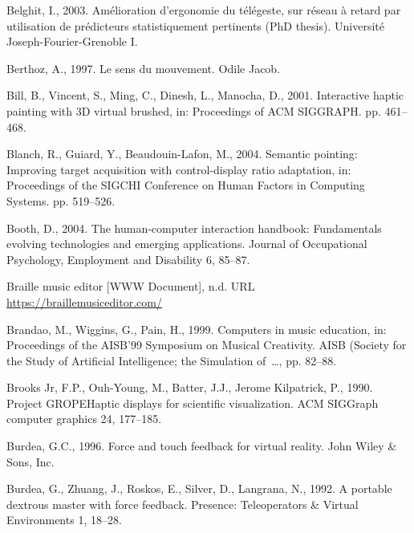 \documentclass[
]{book}
\newlength{\cslhangindent}
\newlength{\cslentryspacingunit} %
\newenvironment{CSLReferences}[2] %
 {%
  \setlength{\parindent}{0pt}
  \ifodd #1
  \let\oldpar\par
  \def\par{\hangindent=\cslhangindent\oldpar}
  \fi
  \setlength{\parskip}{#2\cslentryspacingunit}
 }%
 {}
\begin{document}
\begin{CSLReferences}{1}{0}
\leavevmode{}%
Belghit, I., 2003. Am{é}lioration d'ergonomie du t{é}l{é}geste, sur r{é}seau {à} retard par utilisation de pr{é}dicteurs statistiquement pertinents (PhD thesis). Universit{é} Joseph-Fourier-Grenoble I.

\leavevmode{}%
Berthoz, A., 1997. Le sens du mouvement. Odile Jacob.

\leavevmode{}%
Bill, B., Vincent, S., Ming, C., Dinesh, L., Manocha, D., 2001. Interactive haptic painting with 3D virtual brushed, in: Proceedings of ACM SIGGRAPH. pp. 461--468.

\leavevmode{}%
Blanch, R., Guiard, Y., Beaudouin-Lafon, M., 2004. Semantic pointing: Improving target acquisition with control-display ratio adaptation, in: Proceedings of the SIGCHI Conference on Human Factors in Computing Systems. pp. 519--526.

\leavevmode{}%
Booth, D., 2004. The human-computer interaction handbook: Fundamentals evolving technologies and emerging applications. Journal of Occupational Psychology, Employment and Disability 6, 85--87.

\leavevmode{}%
Braille music editor {[}WWW Document{]}, n.d. URL \url{https://braillemusiceditor.com/}

\leavevmode{}%
Brandao, M., Wiggins, G., Pain, H., 1999. Computers in music education, in: Proceedings of the AISB'99 Symposium on Musical Creativity. AISB (Society for the Study of Artificial Intelligence; the Simulation of~\ldots, pp. 82--88.

\leavevmode{}%
Brooks Jr, F.P., Ouh-Young, M., Batter, J.J., Jerome Kilpatrick, P., 1990. Project GROPEHaptic displays for scientific visualization. ACM SIGGraph computer graphics 24, 177--185.

\leavevmode{}%
Burdea, G.C., 1996. Force and touch feedback for virtual reality. John Wiley \& Sons, Inc.

\leavevmode{}%
Burdea, G., Zhuang, J., Roskos, E., Silver, D., Langrana, N., 1992. A portable dextrous master with force feedback. Presence: Teleoperators \& Virtual Environments 1, 18--28.


\end{CSLReferences}
\end{document}
